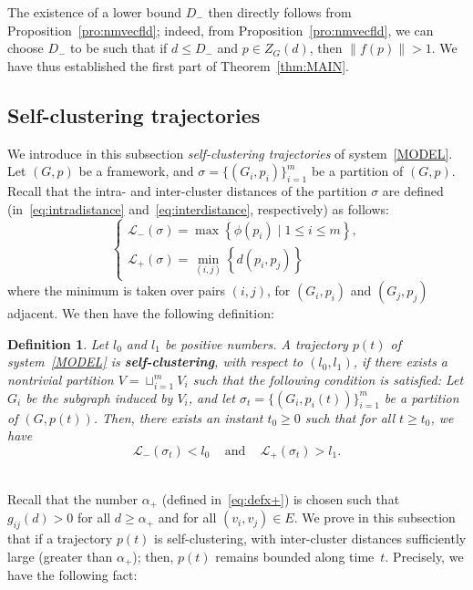 \documentclass[10pt,twocolumn,twoside]{IEEEtran}
\newtheorem{Definition}{Definition}
\renewcommand{\cal}{\mathcal}
\renewcommand{\(}{\left (}
\renewcommand{\)}{\right )}
\renewcommand{\;}{\,;\,}
\begin{document}
The existence of a lower bound $D_-$ then directly follows from Proposition~\ref{pro:nmvecfld}; indeed, from Proposition~\ref{pro:nmvecfld}, we can choose $D_-$ to be such that if 
$d\le D_-$ and $p\in Z_G(d)$, then $\|f(p)\| > 1$. 
We have thus established the first part of Theorem~\ref{thm:MAIN}. 



\subsection{Self-clustering trajectories}\label{ssec:sct}
We introduce in this subsection {\it self-clustering trajectories} of system~\eqref{MODEL}. Let $(G,p)$ be a framework, and $\sigma = \{(G_i,p_i)\}^m_{i=1}$ be a partition of $(G,p)$. Recall that the intra- and inter-cluster distances of the partition $\sigma$ are defined (in~\eqref{eq:intradistance} and~\eqref{eq:interdistance}, respectively) as follows:
\begin{equation*}
\left\{
\begin{array}{l}
\cal{L}_-(\sigma)= \max\left \{ \phi(p_i) \mid 1\le i \le m  \right\}, \\
\cal{L}_+(\sigma) = \min_{(i,j)} \left \{ d(p_i,p_j) \right \}
\end{array}
\right. 
\end{equation*} 
where the minimum is taken over pairs $(i,j)$, for $(G_i,p_i)$ and $(G_j,p_j)$ adjacent.  
We then have the following definition:




\begin{Definition}\label{def:selfclustering}
Let $l_0$ and $l_1$ be positive numbers. A trajectory $p(t)$ of system~\eqref{MODEL} is {\bf self-clustering}, with respect to $(l_0,l_1)$, if there exists a nontrivial partition $V = \sqcup^{m}_{i =1} V_i$ such that the following condition is satisfied: Let $G_i$ be the subgraph induced by $V_i$, and let $\sigma_t = \{(G_i, p_i(t))\}^m_{i = 1}$ be a partition of $(G,p(t))$.  Then, there exists an instant $t_0\ge 0$ such that for all $t \ge t_0$, we have
\begin{equation}\label{eq:defselfclustering}
\cal{L}_-(\sigma_t) < l_0 \hspace{10pt} \mbox{ and } \hspace{10pt} \cal{L}_+(\sigma_t) > l_1. 
\end{equation} \,

\end{Definition} 

Recall that  the number $\alpha_+$ (defined in~\eqref{eq:defx+}) is chosen such that 
$
g_{ij}(d) > 0   
$ for all $d \ge \alpha_+$  and for all $(v_i,v_j)\in E$. 
We prove in this subsection that if a trajectory $p(t)$ is self-clustering, with inter-cluster distances sufficiently large (greater than $\alpha_+$); then, $p(t)$ remains bounded along time~$t$. Precisely, we have  the following fact:   
\end{document}
